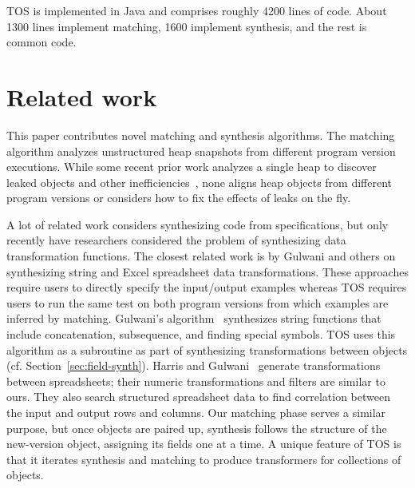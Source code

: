 \documentclass[natbib,10pt]{sigplanconf}
\newcommand{\TOS}{TOS\xspace}
\newcommand{\mwh}[1]{\textcolor{blue}{Mike: #1}}
\begin{document}
\TOS is implemented in Java and comprises roughly 4200 lines
of code. About 1300 lines implement matching, 1600 implement
synthesis, and the rest is common code.






\section{Related work}

This paper contributes novel matching and synthesis algorithms. The
matching algorithm analyzes unstructured heap snapshots from different
program version executions.  While some recent prior work analyzes a
single heap to discover leaked objects and other
inefficiencies~\cite{BM:06,BM:09,JM:07,MS:03,MS:07,XR:10}, none aligns
heap objects from different program versions or considers how to
fix the effects of leaks on the fly.

A lot of related work considers synthesizing code from specifications,
but only recently have researchers considered the problem of
synthesizing data transformation functions.  The closest related work
is by Gulwani and others on synthesizing string and Excel spreadsheet
data transformations.  These approaches require users to directly
specify the input/output examples whereas \TOS requires users to run
the same test on both program versions from which examples are
inferred by matching.  
Gulwani's
algorithm~\cite{Gulwani:popl:2011} synthesizes string functions that
include concatenation, subsequence, and finding special symbols.  \TOS
uses this algorithm as a subroutine as part of synthesizing
transformations between objects (cf. Section~\ref{sec:field-synth}).
Harris and Gulwani~\cite{Gulwani:pldi:2011} generate transformations
between spreadsheets; their numeric transformations and filters are
similar to ours.  They also search structured spreadsheet data to find
correlation between the input and output rows and columns. Our
matching phase serves a similar purpose, but once objects are paired
up, synthesis follows the structure of the new-version object,
assigning its fields one at a time.  
A unique feature of \TOS is that it iterates synthesis and matching to produce
transformers for collections of objects.
\end{document}
